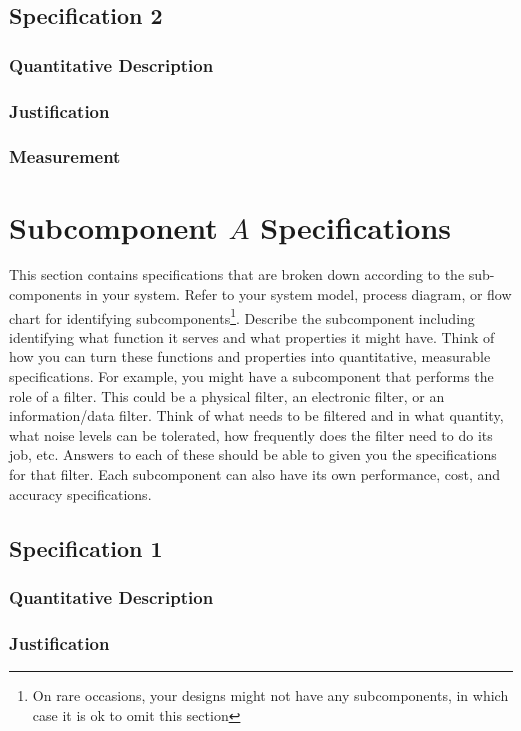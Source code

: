 \documentclass[11pt, oneside]{article}   	%
\begin{document}
\subsection{Specification 2}
\subsubsection{Quantitative Description}
\subsubsection{Justification}
\subsubsection{Measurement}
\clearpage
\section{Subcomponent $A$ Specifications}
This section contains specifications that are broken down according to the sub-components in your system. Refer to your system model, process diagram, or flow chart for identifying subcomponents\footnote{On rare occasions, your designs might not have any subcomponents, in which case it is ok to omit this section}. Describe the subcomponent including identifying what function it serves and what properties it might have. Think of how you can turn these functions and properties into quantitative, measurable specifications. For example, you might have a subcomponent that performs the role of a filter. This could be a physical filter, an electronic filter, or an information/data filter. Think of what needs to be filtered and in what quantity, what noise levels can be tolerated, how frequently does the filter need to do its job, etc. Answers to each of these should be able to given you the specifications for that filter. Each subcomponent can also have its own performance, cost, and accuracy specifications.

\subsection{Specification 1}
\subsubsection{Quantitative Description}
\subsubsection{Justification}
\end{document}
